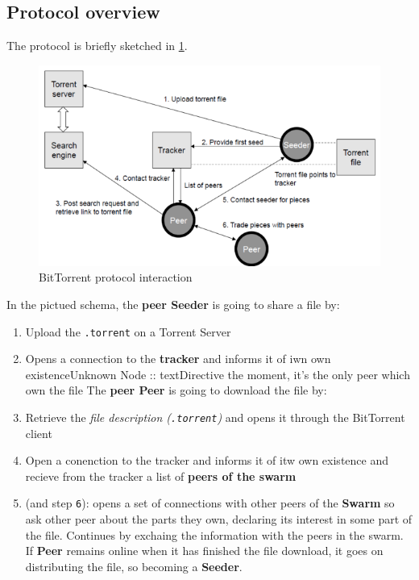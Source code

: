 \documentclass[10pt,a4paper]{report}
\begin{document}
\subsection{Protocol overview}\label{sec:protocol-overview}
The protocol is briefly sketched in \ref{torrent-protocol}.

	\begin{figure}[h!]
		\centering
	\includegraphics[scale=0.60]{images/Pasted image 20230311094220.png}
	\caption{BitTorrent protocol interaction}
	\label{torrent-protocol}

\end{figure}


In the pictued schema, the \textbf{peer Seeder} is going to share a file by:
\begin{enumerate}
	\item 
	Upload the \texttt{.torrent} on a Torrent Server
	\item 
	Opens a connection to the \textbf{tracker} and informs it of iwn own existenceUnknown Node :: textDirective
	the moment, it's the only peer which own the file
	The \textbf{peer Peer} is going to download the file by:
	\item 
	Retrieve the \textit{file description (\texttt{.torrent})} and opens it through the BitTorrent client
	\item 
	Open a conenction to the tracker and informs it of itw own existence and recieve from the tracker a list of \textbf{peers of the swarm}
	\item 
	(and step \texttt{6}): opens a set of connections with other peers of the \textbf{Swarm} so ask other peer about the parts they own, declaring its interest in some part of the file. Continues by exchaing the information with the peers in the swarm.
	If \textbf{Peer} remains online when it has finished the file download, it goes on distributing the file, so becoming a \textbf{Seeder}.
\end{enumerate}
\end{document}
